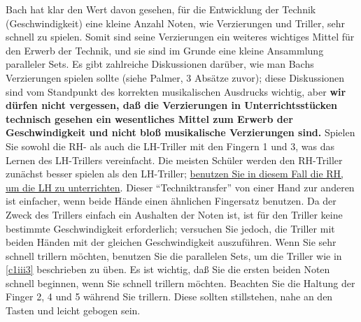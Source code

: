 Bach hat klar den Wert davon gesehen, für die Entwicklung der Technik (Geschwindigkeit) eine kleine Anzahl Noten, wie Verzierungen und Triller, sehr schnell zu spielen.
Somit sind seine Verzierungen ein weiteres wichtiges Mittel für den Erwerb der Technik, und sie sind im Grunde eine kleine Ansammlung paralleler Sets.
Es gibt zahlreiche Diskussionen darüber, wie man Bachs Verzierungen spielen sollte (siehe Palmer, 3 Absätze zuvor); diese Diskussionen sind vom Standpunkt des korrekten musikalischen Ausdrucks wichtig, aber \textbf{wir dürfen nicht vergessen, daß die Verzierungen in Unterrichtsstücken technisch gesehen ein wesentliches Mittel zum Erwerb der Geschwindigkeit und nicht bloß musikalische Verzierungen sind.}
Spielen Sie sowohl die RH- als auch die LH-Triller mit den Fingern 1 und 3, was das Lernen des LH-Trillers vereinfacht.
Die meisten Schüler werden den RH-Triller zunächst besser spielen als den LH-Triller; \hyperref[c1ii20]{benutzen Sie in diesem Fall die RH, um die LH zu unterrichten}.
Dieser \enquote{Techniktransfer} von einer Hand zur anderen ist einfacher, wenn beide Hände einen ähnlichen Fingersatz benutzen.
Da der Zweck des Trillers einfach ein Aushalten der Noten ist, ist für den Triller keine bestimmte Geschwindigkeit erforderlich; versuchen Sie jedoch, die Triller mit beiden Händen mit der gleichen Geschwindigkeit auszuführen.
Wenn Sie sehr schnell trillern möchten, benutzen Sie die parallelen Sets, um die Triller wie in \hyperref[c1iii3]{\autoref{c1iii3}} beschrieben zu üben.
Es ist wichtig, daß Sie die ersten beiden Noten schnell beginnen, wenn Sie schnell trillern möchten.
Beachten Sie die Haltung der Finger 2, 4 und 5 während Sie trillern.
Diese sollten stillstehen, nahe an den Tasten und leicht gebogen sein.

